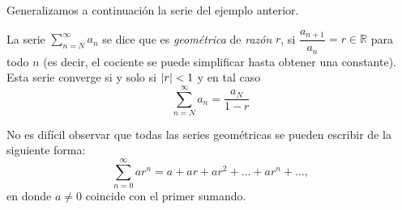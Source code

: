 Generalizamos a continuación la serie del ejemplo anterior.

\begin{teorema}
La serie $\displaystyle\sum_{n=N}^\infty a_n$ se dice que es \emph{geométrica} de \emph{razón} $r$, si $\dfrac{a_{n+1}}{a_n}=r\in\mathbb{R}$ para todo $n$ (es decir, el cociente se puede simplificar hasta obtener una constante).
Esta serie converge si y solo si $|r|< 1$ y en tal caso
\[\displaystyle\sum_{n=N}^\infty a_n = \dfrac{a_N}{1-r}\]
\end{teorema}

No es difícil observar que todas las series geométricas se pueden escribir de la siguiente forma:
\[
\displaystyle\sum_{n=0}^\infty   ar^n=a+ar+ar^2+\dots
+ar^n+\dots,
\]
en donde $a\ne 0$ coincide con el primer sumando.

